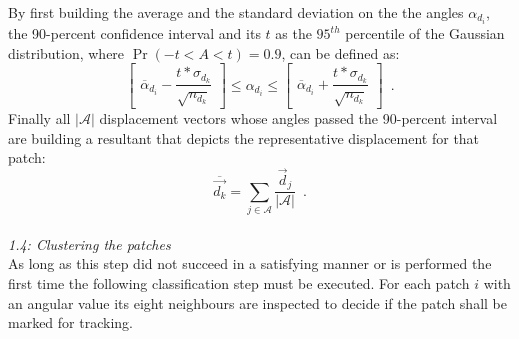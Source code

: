 %
%
By first building the average and the standard deviation on the the angles $\alpha_{d_i}$, the 90-percent confidence interval and its $t$ as the $95^{th}$ percentile of the Gaussian distribution, where $\Pr\left(-t<A<t\right)=0.9$, can be defined as:
%
\begin{equation}
\label{confint}
\begin{bmatrix}  \overline{ \alpha}_{d_i} - \dfrac{t*\sigma_{d_k}}{\sqrt {n_{d_k}} } \end{bmatrix} 
\leq \alpha_{d_i} \leq 
\begin{bmatrix} \overline{ \alpha}_{d_i} + \dfrac{t*\sigma_{d_k}}{\sqrt {n_{d_k}} } \end{bmatrix} \enspace .
\end{equation}
%
Finally all $|\mathcal{A}|$ displacement vectors whose angles passed the 90-percent interval are building a resultant that depicts the representative displacement for that patch:
%
\begin{equation}
\label{representative}
\overline{ \vec{d_k }} =  \sum_{j \in \mathcal{A}}{\frac{\vec{d}_j}{|\mathcal{A}|} } \enspace .
\end{equation}
\\ \newline
%
\textit{1.4: Clustering the patches} \\ \newline
As long as this step did not succeed in a satisfying manner or is performed the first time the following classification step must be executed. For each patch $i$ with an angular value its eight neighbours are inspected to decide if the patch shall be marked for tracking. 
